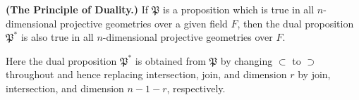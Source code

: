 \textbf{(The Principle of Duality.)} If $\mathfrak{P}$ is a proposition which is true in all $n$-dimensional projective geometries over a given field $F$, then the dual proposition $\mathfrak{P}^*$ is also true in all $n$-dimensional projective geometries over $F$.

Here the dual proposition $\mathfrak{P}^*$ is obtained from $\mathfrak{P}$ by changing $\subset$ to $\supset$ throughout and hence replacing intersection, join, and dimension $r$ by join, intersection, and dimension $n-1-r$, respectively.
